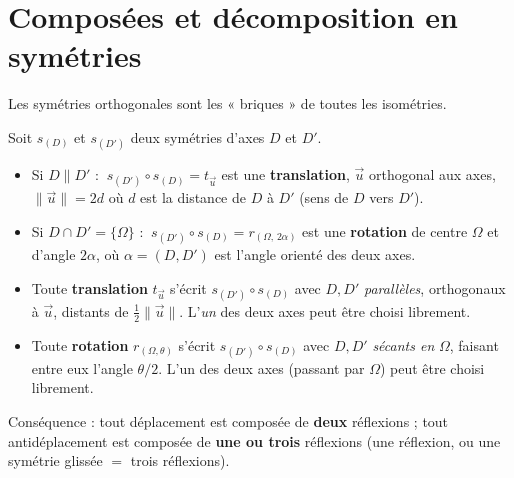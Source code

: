 \section{Composées et décomposition en symétries}

Les symétries orthogonales sont les « briques » de toutes les isométries.

\begin{theoreme}
Soit $s_{(D)}$ et $s_{(D')}$ deux symétries d'axes $D$ et $D'$.
\begin{itemize}
\item Si $D\parallel D'$ : $\ s_{(D')}\circ s_{(D)}=t_{\vec u}$ est une \textbf{translation}, $\vec u$ orthogonal aux axes, $\|\vec u\|=2d$ où $d$ est la distance de $D$ à $D'$ (sens de $D$ vers $D'$).
\item Si $D\cap D'=\{\Omega\}$ : $\ s_{(D')}\circ s_{(D)}=r_{(\Omega,\,2\alpha)}$ est une \textbf{rotation} de centre $\Omega$ et d'angle $2\alpha$, où $\alpha=(D,D')$ est l'angle orienté des deux axes.
\end{itemize}
\end{theoreme}

\begin{propriete}
\begin{itemize}
\item Toute \textbf{translation} $t_{\vec u}$ s'écrit $s_{(D')}\circ s_{(D)}$ avec $D,D'$ \emph{parallèles}, orthogonaux à $\vec u$, distants de $\tfrac12\|\vec u\|$. L'\emph{un} des deux axes peut être choisi librement.
\item Toute \textbf{rotation} $r_{(\Omega,\theta)}$ s'écrit $s_{(D')}\circ s_{(D)}$ avec $D,D'$ \emph{sécants en} $\Omega$, faisant entre eux l'angle $\theta/2$. L'un des deux axes (passant par $\Omega$) peut être choisi librement.
\end{itemize}
Conséquence : tout déplacement est composée de \textbf{deux} réflexions ; tout antidéplacement est composée de \textbf{une ou trois} réflexions (une réflexion, ou une symétrie glissée $=$ trois réflexions).
\end{propriete}

